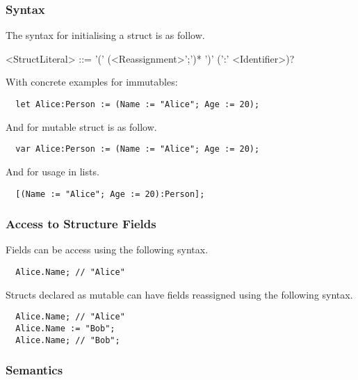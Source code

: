 \subsubsection{Syntax}

The syntax for initialising a struct is as follow.

\begin{grammar}
<StructLiteral> ::= '(' (<Reassignment>';')* ')' (':' <Identifier>)?
\end{grammar}


With concrete examples for immutables:

\begin{verbatim}
  let Alice:Person := (Name := "Alice"; Age := 20);
\end{verbatim}

And for mutable struct is as follow.

\begin{verbatim}
  var Alice:Person := (Name := "Alice"; Age := 20);
\end{verbatim}

And for usage in lists.

\begin{verbatim}
  [(Name := "Alice"; Age := 20):Person];
\end{verbatim}

\subsubsection{Access to Structure Fields}
\label{sec:accessStructFields}

Fields can be access using the following syntax.

\begin{verbatim}
  Alice.Name; // "Alice"
\end{verbatim}

Structs declared as mutable can have fields reassigned using the following syntax.

\begin{verbatim}
  Alice.Name; // "Alice"
  Alice.Name := "Bob";
  Alice.Name; // "Bob";
\end{verbatim}
 
\subsubsection{Semantics}

